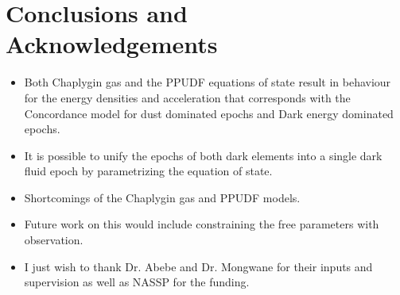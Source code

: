 \documentclass[8pt,hideothersubsections]{beamer}
\begin{document}
\section{Conclusions and Acknowledgements}
\begin{frame}
\begin{itemize}
\frametitle{\insertsectionhead}

\item Both Chaplygin gas and the PPUDF equations of state result in behaviour for the energy densities and acceleration that corresponds with the Concordance model for dust dominated epochs and Dark energy dominated epochs.\\
\hspace{2pt}

\item It is possible to unify the epochs of both dark elements into a single dark fluid epoch by parametrizing the equation of state.\\
\hspace{2pt}

\item Shortcomings of the Chaplygin gas and PPUDF models.\\
\hspace{2pt}


\item Future work on this would include constraining the free parameters with observation. \\
\hspace{2pt}

\item I just wish to thank Dr. Abebe and Dr. Mongwane for their inputs and supervision as well as NASSP for the funding.

\end{itemize}
\end{frame}

%

%
%                               
% 
\end{document}
